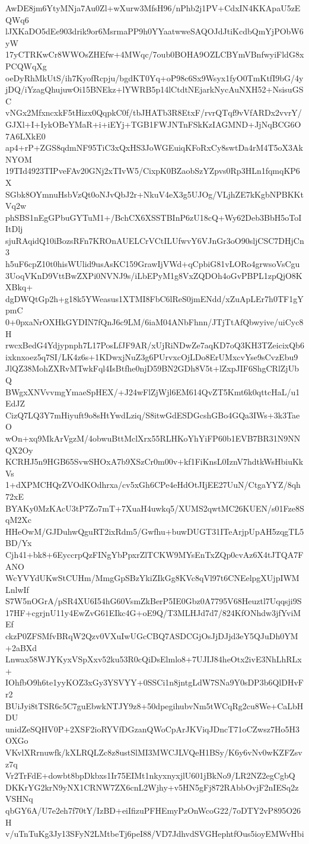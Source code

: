 AwDE8jm6YtyMNja7Au0Zl+wXurw3MfsH96/nPhb2j1PV+CdxIN4KKApaU5zEQWq6
lJXKaDO5dEe903drik9or6MsrmaPP9h0YYaatwweSAQOJdJtiKcdbQmYjPObW6yW
17yCTRKwCr8WWOsZHEfw+4MWqc/7oub0BOHA9OZLCBYmVBnfwyiFldG8xPCQWqXg
oeDyRhMkUtS/ih7KyofRcpju/bgdKT0Yq+oP98c6Sx9Wsyx1fyO0TmKtfI9bG/4y
jDQ/iYzagQhujuwOi15BNEkz+lYWRB5p14lCtdtNEjarkNycAuNXH52+NsisuGSC
vNGx2MfxncxkF5tHizx0QqpkC0f/tbJHATb3R8EtxF/rvrQTqf9vVfARDx2vvrY/
GJXl+I+IykOBeYMaR+i+iEYj+TGB1FWJNTnFSkKzIAGMND+JjNqBCG6O7A6LXkE0
ap4+rP+ZGS8qdmNF95TiC3xQxHS3JoWGEuiqKFoRxCy8swtDa4rM4T5oX3AkNYOM
19TId4923TIPveFAv20GNj2xTIvW5/CixpK0BZaobSzYZpvs0Rp3HLn1fqmqKP6X
SGbk8OYmnuHsbVzQt0oNJvQbJ2r+NkuV4eX3g5UJOg/VLjhZE7kKgbNPBKKtVq2w
phSBS1nEgGPbuGYTuM1+/BchCX6XSSTBInP6zU18cQ+Wy62Deb3BbH5oToIItDlj
sjuRAqidQ10iBozsRFn7KROnAUELCrVCtILUfwvY6VJnGr3oO90sljCSC7DHjCn3
h5uF6cpZ10t0hisWUlid9usAsKC159GrawIjVWd+qCpbiG81vLORo4grwsoVsCgu
3UoqVKnD9VttBwZXPi0NVNJ9s/iLbEPyM1g8VxZQDOh4oGvPBPL1zpQjO8KXBkq+
dgDWQtGp2h+g18k5YWeasus1XTMI8FbC6lReS0jmENdd/xZuApLEr7h0TF1gYpmC
0+0pxaNrOXHkGYDIN7fQnJ6c9LM/6iaM04ANbFhnn/JTjTtAfQbwyive/uiCyc8H
rwcxBedG4Ydjypnph7L17PosLfJF9AR/xUjRiNDwZe7aqKD7oQ3KH3TZeicixQb6
ixknxoez5q7SI/LK4z6s+1KDwxjNuZ3g6PUrvxcOjLDo8ErUMxcvYse9sCvzEbu9
JlQZ38MohZXRvMTwkFql4IsBtfhe0njD59BN2GDh8V5t+lZxpJIF6ShgCRlZjUbQ
BWgxXNVvvmgYmaeSpHEX/+J24wFlZjWjl6EM614QvZT5Kmt6k0qttcHaL/u1EdJZ
CizQ7LQ3Y7mHiyuft9o8sHtYwdLziq/S8itwGdESDGcshGBo4GQa3IWs+3k3TaeO
wOn+xq9MkArVgzM/4obwuBttMclXrx55RLHKoYhYiFP60b1EVB7BR31N9NNQX2Oy
KCRHJ5n9HGB65SvwSHOxA7b9XSzCr0m00v+kf1FiKnsL0IznV7hdtkWsHbiuKkVs
1+dXPMCHQrZVOdKOdhrxa/cv5xGh6CPe4eHdOtJIjEE27UuN/CtgaYYZ/8qh72xE
BYAKy0MzKAcU3tP7Zo7mT+7XuaH4uwkq5/XUMS2qwtMC26KUEN/s01Fze8SqM2Xc
HHeOwM/GJDuhwQguRT2ixRdm5/Gwfhu+buwDUGT31ITeArjpUpAH5zqgTL5BD/Yx
Cjh41+bk8+6EyccrpQzFINgYbPpxrZlTCKW9MYsEnTxZQp0cvAz6X4tJTQA7FANO
WcYVYdUKwStCUHm/MmgGpSBzYkiZIkGg8KVc8qVl97t6CNEelpgXUjpIWMLnlwIf
S7W5nOGrA/pSR4XU6I54hG60VsmZkBerP5IE0Gbz0A7795V68Heuztl7Uqqsji9S
17HF+cgrjnU11y4EwZvG61EIkc4G+oE9Q/T3MLHJd7d7/824KfONhdw3jfYviMEf
ckzP0ZFSMfvBRqW2Qzv0VXuIwUGcCBQ7ASDCGjOsJjDJjd3eY5QJuDh0YM+2aBXd
Lnwax58WJYKyxVSpXxv52ku53R0cQiDsElmlo8+7UJIJ84heOtx2ivE3NhLhRLx+
IOhfbO9h6te1yyKOZ3xGy3YSVYY+0SSCi1n8jntgLdW7SNa9Y0sDP3b6QlDHvFr2
BUiJyi8tTSR6c5C7guEbwkNTJY9z8+50dpegihubvNm5tWCqRg2cu8We+CaLbHDU
unidZeSQHV0P+2XSF2ioRYVfDGzanQWoCpArJKViqJDncT71oCZwsz7Ho5H3OXGo
VKvlXRrnuwfk/kXLRQLZc8z8ustSlMI3MWCJLVQeH1BSy/K6y6vNv0wKZFZsvz7q
Vr2TrFdE+dowbt8bpDkbxs1Ir75EIMt1nkyxnyxjlU601jBkNo9/LR2NZ2egCgbQ
DKKrYG2krN9yNX1CRNW7ZX6cnL2Wjhy+v5HN5gFj872RAbbOvjF2nIESq2zVSHNq
qbGY6A/U7e2eh7f70tY/IzBD+eiIfizuPFHEmyPzOnWcoG22/7oDTY2vP895O26H
v/uTnTuKg3Jy13SFyN2LMtbeTj6peI88/VD7JdhvdSVGHephtfOus5ioyEMWvHbi
